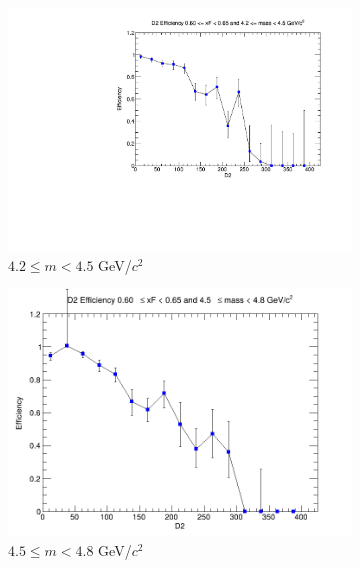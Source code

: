\documentclass[11pt]{article}
\begin{document}
\begin{figure}[p]
    \centering
    \begin{subfigure}[b]{0.32\textwidth}
        \centering
        \includegraphics[width=\textwidth]{./kTrackerEfficiencyPlots/D2_Efficiency_xF12_mass0.pdf}
        \caption{$4.2 \leq m < 4.5$ GeV/$c^2$}
    \end{subfigure}\hfill
    \begin{subfigure}[b]{0.32\textwidth}
        \centering
        \includegraphics[width=\textwidth]{./kTrackerEfficiencyPlots/D2_Efficiency_xF12_mass1.png}
        \caption{$4.5 \leq m < 4.8$ GeV/$c^2$}
    \end{subfigure}\hfill
    \begin{subfigure}[b]{0.32\textwidth}
        \centering

\end{subfigure}
\end{figure}
\end{document}
